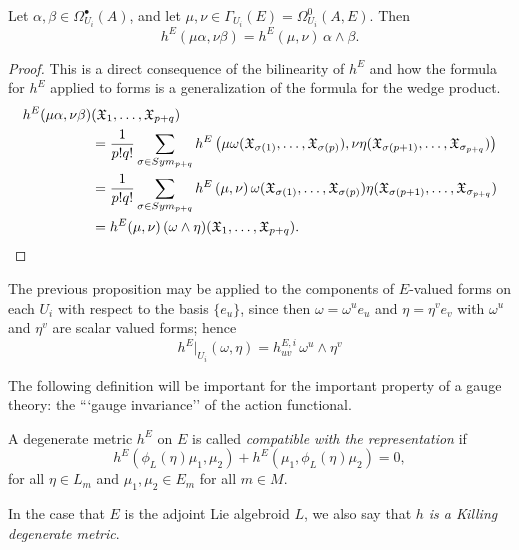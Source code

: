 \begin{proposition}
Let $\alpha, \beta \in \Omega_{U_i}^\bullet(A)$, and let $\mu, \nu \in \Gamma_{U_i}(E) = \Omega^0_{U_i}(A, E)$. Then
\begin{equation}
    h^E(\mu \alpha, \nu \beta) = h^E(\mu, \nu) \, \alpha \wedge \beta.
\end{equation}
\end{proposition}
\begin{proof}
This is a direct consequence of the bilinearity of $h^E$  and how the formula for $h^E$ applied to forms is a generalization of the formula for the wedge product.
\begin{align*}
    h^E(\mu \alpha, \nu \beta)&(\mathfrak{X}_1, \dots, \mathfrak{X}_{p+q})\\
    &=\frac{1}{p!q!} \sum_{\sigma \in Sym_{p+q}} h^E\left( \mu \omega(\mathfrak{X}_{\sigma(1)}, \dots, \mathfrak{X}_{\sigma(p)}),  \nu \eta(\mathfrak{X}_{\sigma(p+1)}, \dots, \mathfrak{X}_{\sigma_{p+q}}) \right) \\
    &= \frac{1}{p!q!} \sum_{\sigma \in Sym_{p+q}} 
        h^E\left( \mu ,  \nu  \right) 
        \omega(\mathfrak{X}_{\sigma(1)}, \dots, \mathfrak{X}_{\sigma(p)}) \eta(\mathfrak{X}_{\sigma(p+1)}, \dots, \mathfrak{X}_{\sigma_{p+q}})\\
    &= h^E(\mu, \nu) \, (\omega \wedge \eta)(\mathfrak{X}_1, \dots, \mathfrak{X}_{p+q}).
\end{align*}
\end{proof}

The previous proposition may be applied to the components of $E$-valued forms on each $U_i$ with respect to the basis $\{e_u\}$, since then $\omega = \omega^u e_u$ and $\eta = \eta^v e_v$ with $\omega^u$ and $\eta^v$ are scalar valued forms; hence
\begin{equation}\label{equationLocalhProductOfMetrics}
    h^E|_{U_i}(\omega, \eta) = h^{E,i}_{uv}\,\omega^u \wedge \eta^v 
\end{equation}

The following definition will be important for the important property of a gauge theory: the ```gauge invariance'' of the action functional.

\begin{definition}\label{definitionMetricCompatibleRepresentationKilling}
A degenerate metric $h^E$ on $E$ is called \emph{compatible with the representation} if
\begin{equation*}
    h^E(\phi_L(\eta) \mu_1, \mu_2) + h^E(\mu_1, \phi_L(\eta)\mu_2) = 0,
\end{equation*}
for all $\eta \in L_m$ and $\mu_1, \mu_2 \in E_m$ for all $m \in M$.

\noindent In the case that $E$ is the adjoint Lie algebroid $L$, we also say that \emph{$h$ is a Killing degenerate metric}.
\end{definition}

